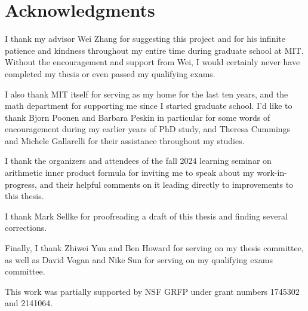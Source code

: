 

\chapter*{Acknowledgments}

I thank my advisor Wei Zhang for suggesting this project
and for his infinite patience and kindness
throughout my entire time during graduate school at MIT.
Without the encouragement and support from Wei,
I would certainly never have completed my thesis or even passed my qualifying exams.

I also thank MIT itself for serving as my home for the last ten years,
and the math department for supporting me since I started graduate school.
I'd like to thank Bjorn Poonen and Barbara Peskin in particular
for some words of encouragement during my earlier years of PhD study,
and Theresa Cummings and Michele Gallarelli for their assistance throughout my studies.

I thank the organizers and attendees of the fall 2024
learning seminar on arithmetic inner product formula
for inviting me to speak about my work-in-progress, and their helpful comments on it
leading directly to improvements to this thesis.

I thank Mark Sellke for proofreading a draft of this thesis
and finding several corrections.

Finally, I thank Zhiwei Yun and Ben Howard for serving on my thesis committee,
as well as David Vogan and Nike Sun for serving on my qualifying exams committee.

This work was partially supported by NSF GRFP under grant numbers 1745302 and 2141064.
